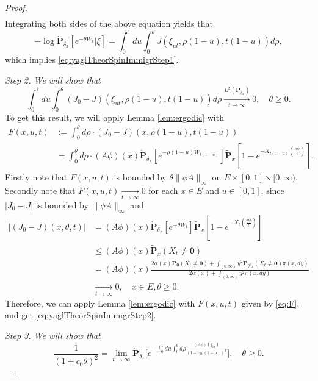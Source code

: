 \documentclass[UTF8]{pkuthss}
\theoremstyle{plain}
\theoremstyle{definition}
\numberwithin{equation}{section}
\begin{document}
\begin{proof}
\begin{align}
\end{align}
	Integrating both sides of the above equation yields that
\[
	-\log \dot{\mathbf P}_{\delta_x}[e^{-\theta W_t}|\xi]
	=\int_0^1 du\int_0^\theta J(\xi_{ut},\rho(1-u),t(1-u)) d\rho,
\]
	which implies \eqref{eq:yaglTheorSpinImmigrStep1}.
\par
	\emph{Step 2. We will show that}
\begin{equation}\label{eq:yaglTheorSpinImmigrStep2}
	\int_0^1 du\int_0^\theta (J_0-J)(\xi_{ut},\rho(1-u),t(1-u)) d\rho
	\xrightarrow[t\to\infty]{L^2(\dot{\mathbf P}_{\delta_x})} 0,\quad \theta\geq 0.
\end{equation}
	To get this result, we will apply Lemma \ref{lem:ergodic} with
\begin{align}\label{eq:F}
	F(x,u,t)
	&:=\int_0^\theta d\rho\cdot (J_0-J)(x,\rho(1-u),t(1-u))\\
	&=\int_0^\theta d\rho\cdot  (A\phi)(x)\dot{\mathbf P}_{\delta_{x}}[e^{-\rho(1-u)W_{t(1-u)}}]\widetilde{\mathbf P}_{x}[1-e^{-X_{t(1-u)}(\frac{\rho\phi}{t})}].
\end{align}
	Firstly note that $F(x,u,t)$ is bounded by $\theta\|\phi A\|_\infty$ on $E\times[0,1]\times[0,\infty)$.
	Secondly note that $F(x,u,t)\xrightarrow[t\to\infty]{} 0$ for each $x\in E$ and $u\in[0,1]$, since $|J_0-J|$ is bounded by $\|\phi A\|_\infty$ and
\begin{align}
	\big|(J_0-J)(x,\theta,t)\big|
	&=  (A\phi)(x)\dot{\mathbf P}_{\delta_{x}}[e^{-\theta W_{t}}]\widetilde{\mathbf P}_{x}[1-e^{-X_t(\frac{\theta\phi}{t})}]\\
	&\leq  (A\phi)(x)\widetilde{\mathbf P}_{x}(X_t\neq \mathbf 0) \\
	&=  (A\phi)(x)\frac{2\alpha(x)\mathbf P_{\mathbf 0}(X_t\neq \mathbf 0)+\int_{(0,\infty)}y^2\mathbf P_{y\delta_x}(X_t\neq \mathbf 0)\pi(x,dy)}{2\alpha(x)+\int_{(0,\infty)}y^2\pi(x,dy)}\\
	&\xrightarrow[t\to\infty]{} 0, \quad x\in E,\theta\geq 0.
\end{align}
	Therefore, we can apply Lemma \ref{lem:ergodic} with $F(x,u,t)$ given by \eqref{eq:F}, and get \eqref{eq:yaglTheorSpinImmigrStep2}.
\par
	\emph{Step 3. We will show that}
\begin{equation}\label{eq:yaglTheorSpinImmigrStep3}
	\frac{1}{(1+c_0\theta)^2}
	= \lim_{t\to\infty} \dot {\mathbf P}_{\delta_x} \Big[e^{- \int_0^1 du \int_0^\theta d\rho \frac{ (A\phi)(\xi_{ut})}{(1+c_0\rho(1-u))^2} }\Big],
	\quad \theta\geq 0.
\end{equation}

\end{proof}
\end{document}

